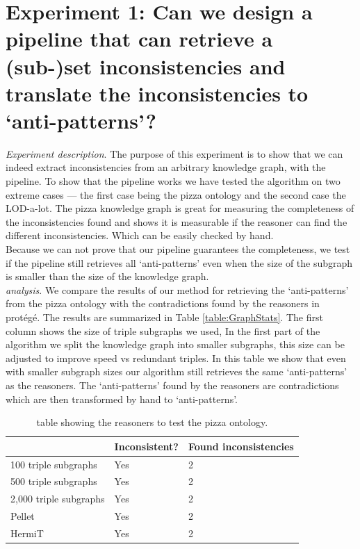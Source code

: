 \documentclass[11pt,letterpaper ,oneside ]{book}
\begin{document}
\section{Experiment 1:  Can we design a pipeline that can retrieve a (sub-)set inconsistencies and translate the inconsistencies to `anti-patterns'?}
\textit{Experiment description}. The purpose of this experiment is to show that we can indeed extract inconsistencies from an arbitrary knowledge graph, with the pipeline. 
To show that the pipeline works we have tested the algorithm on two extreme cases — the first case being the pizza ontology and the second case the LOD-a-lot.
The pizza knowledge graph is great for measuring the completeness of the inconsistencies found and shows it is measurable if the reasoner can find the different inconsistencies. Which can be easily checked by hand.\\
Because we can not prove that our pipeline guarantees the completeness, we test if the pipeline still retrieves all `anti-patterns' even when the size of the subgraph is 
smaller than the size of the knowledge graph.\\
\textit{analysis}. We compare the results of our method for retrieving the `anti-patterns' from the pizza ontology with the contradictions found by the reasoners in prot\'{e}g\'{e}.
The results are summarized in Table \ref{table:GraphStats}. The first column shows the size of triple subgraphs we used, In the first part of the algorithm we split the knowledge graph into smaller subgraphs, this size can be adjusted to improve speed vs redundant triples. In this table we show that even with smaller subgraph sizes our algorithm still retrieves the same `anti-patterns' as the reasoners. The `anti-patterns' found by the reasoners are contradictions which are then transformed by hand to `anti-patterns'. 

\begin{table}[!t]
	\begin{tabular}{|l|l|l|}
		\hline
		& Inconsistent? & Found inconsistencies \\ \hline \hline
		100 triple subgraphs     & Yes           & 2 \\ \hline
		500 triple subgraphs     & Yes           & 2 \\ \hline
		2,000 triple subgraphs     & Yes           & 2\\ \hline
		Pellet                     & Yes           & 2\\ \hline
		HermiT                     & Yes           & 2\\ \hline
	\end{tabular}
	\caption{table showing the reasoners to test the pizza ontology.}
	\label{table:PizzaOntology}
\end{table}
\end{document}
